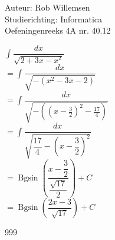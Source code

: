 \documentclass[a4paper]{article}
\newcommand{\dint}{\displaystyle\int}
\newcommand{\Bgsin}{\operatorname{Bgsin}}
\begin{document}
\noindent \large Auteur: Rob Willemsen \\
\noindent \large Studierichting: Informatica \\
\noindent \large Oefeningenreeks 4A nr. 40.12 \\

\medskip

\normalsize

$\dint \dfrac{dx}{\sqrt{2+3x-x^2}}$ \\

$=\dint \dfrac{dx}{\sqrt{-(x^2-3x-2)}}$ \\

$=\dint \dfrac{dx}{\sqrt{-((x-\frac{3}{2})^2-\frac{17}{4})}}$ \\

$=\dint \dfrac{dx}{\sqrt{\dfrac{17}{4}- \left(x-\dfrac{3}{2}\right)^2}}$ \\

$=\Bgsin\left(\dfrac{x-\dfrac{3}{2}}{\dfrac{\sqrt{17}}{2}}\right) + C$ \\

$=\Bgsin\left(\dfrac{2x-3}{\sqrt{17}}\right) + C$ \\

\begin{thebibliography}{999}
\end{thebibliography}
\end{document}
